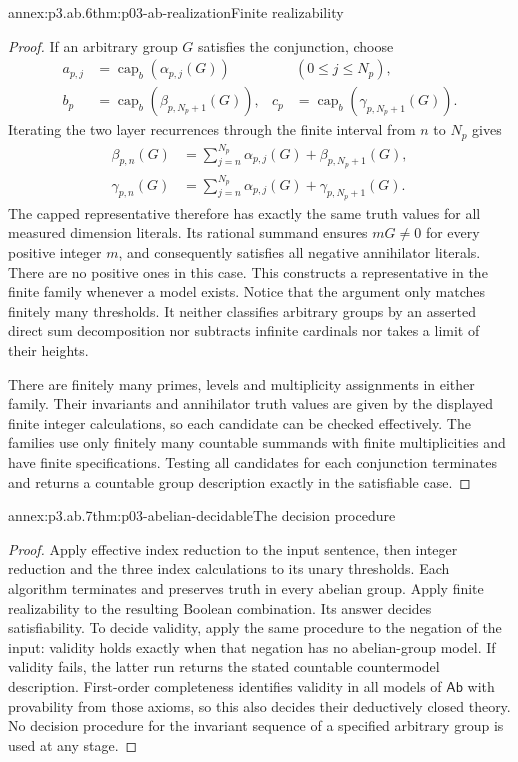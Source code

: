 \begin{annexitem}{annex:p3.ab.6}{thm:p03-ab-realization}{Finite realizability}
\begin{proof}
If an arbitrary group \(G\) satisfies the conjunction, choose
\[
 \begin{aligned}
 a_{p,j}&=\operatorname{cap}_b(\alpha_{p,j}(G))
                    &&(0\leq j\leq N_p),\\
 b_p&=\operatorname{cap}_b(\beta_{p,N_p+1}(G)),&
 c_p&=\operatorname{cap}_b(\gamma_{p,N_p+1}(G)).
 \end{aligned}
\]
Iterating the two layer recurrences through the finite interval from
\(n\) to \(N_p\) gives
\[
 \begin{aligned}
 \beta_{p,n}(G)&=\sum_{j=n}^{N_p}\alpha_{p,j}(G)
                         +\beta_{p,N_p+1}(G),\\
 \gamma_{p,n}(G)&=\sum_{j=n}^{N_p}\alpha_{p,j}(G)
                         +\gamma_{p,N_p+1}(G).
 \end{aligned}
\]
The capped representative therefore has exactly the same truth values
for all measured dimension literals. Its rational summand ensures
\(mG\ne0\) for every positive integer \(m\), and consequently satisfies
all negative annihilator literals. There are no positive ones in this
case. This constructs a representative in the finite family whenever
a model exists. Notice that the argument only matches finitely many
thresholds. It neither classifies arbitrary groups by an asserted direct
sum decomposition nor subtracts infinite cardinals nor takes a limit
of their heights.

There are finitely many primes, levels and multiplicity assignments
in either family. Their invariants and annihilator truth values are
given by the displayed finite integer calculations, so each candidate
can be checked effectively. The families use only finitely many
countable summands with finite multiplicities and have finite
specifications. Testing all candidates for each conjunction terminates
and returns a countable group description exactly in the satisfiable
case.
\end{proof}
\end{annexitem}

\begin{annexitem}{annex:p3.ab.7}{thm:p03-abelian-decidable}{The decision procedure}
\begin{proof}
Apply effective index reduction to the input sentence, then integer
reduction and the three index calculations to its unary thresholds.
Each algorithm terminates and preserves truth in every abelian group.
Apply finite realizability to the resulting Boolean combination.
Its answer decides satisfiability. To decide validity, apply the same
procedure to the negation of the input: validity holds exactly when
that negation has no abelian-group model. If validity fails, the latter
run returns the stated countable countermodel description. First-order
completeness identifies validity in all models of \(\mathsf{Ab}\) with
provability from those axioms, so this also decides their deductively
closed theory. No decision procedure for the invariant sequence of a
specified arbitrary group is used at any stage.
\end{proof}
\end{annexitem}

